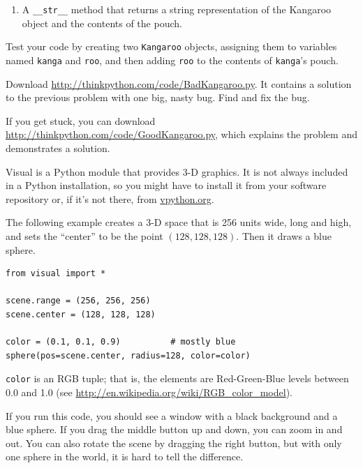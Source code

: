 \documentclass[10pt]{book}
\begin{document}
\begin{CJK}{UTF8}{gbsn}
\begin{exercise}
\begin{enumerate}
\item A \verb"__str__" method that returns a string representation
of the Kangaroo object and the contents of the pouch.

\end{enumerate}
%
Test your code 
by creating two {\tt Kangaroo} objects, assigning them to variables
named {\tt kanga} and {\tt roo}, and then adding {\tt roo} to the
contents of {\tt kanga}'s pouch.

Download \url{http://thinkpython.com/code/BadKangaroo.py}.  It contains
a solution to the previous problem with one big, nasty bug.
Find and fix the bug.

If you get stuck, you can download
\url{http://thinkpython.com/code/GoodKangaroo.py}, which explains the
problem and demonstrates a solution.

\end{exercise}




\begin{exercise}

Visual is a Python module that provides 3-D graphics.  It is
not always included in a Python installation, so you might have
to install it from your software repository or, if it's not there,
from \url{vpython.org}.

The following example creates a 3-D space that is 256 units
wide, long and high, and sets the ``center'' to be the
point $(128,128,128)$.  Then it draws a blue sphere.

\begin{verbatim}
from visual import *

scene.range = (256, 256, 256)
scene.center = (128, 128, 128)

color = (0.1, 0.1, 0.9)          # mostly blue
sphere(pos=scene.center, radius=128, color=color)
\end{verbatim}

{\tt color} is an RGB tuple; that is, the elements are Red-Green-Blue
levels between 0.0 and 1.0 (see
\url{http://en.wikipedia.org/wiki/RGB_color_model}).

If you run this code, you should see a window with a black
background and a blue sphere.  If you drag the middle button
up and down, you can zoom in and out.  You can also rotate
the scene by dragging the right button, but with only one
sphere in the world, it is hard to tell the difference.


\end{exercise}
\end{CJK}
\end{document}
